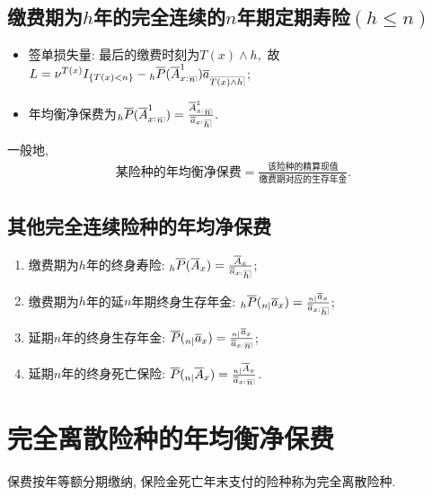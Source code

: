 \documentclass[lang=cn,10pt]{elegantbook}
\makeatletter
\DeclareRobustCommand{\annu}[1]{_{%
    \def\arraystretch{0}%
    \setlength\arraycolsep{1pt}%
    \setlength\arrayrulewidth{.2pt}%
    \begin{array}[b]{@{}c|}\hline
        \\[\arraycolsep]%
        \scriptstyle #1%
    \end{array}%
}}
\makeatother
\begin{document}
\subsection{缴费期为$h$年的完全连续的$n$年期定期寿险$(h\le n)$}
\begin{proposition}
    \begin{itemize}
        \item 签单损失量: 最后的缴费时刻为$T(x)\land h,$ 故$L=\nu^{T(x)}I_{\{T(x)<n\}}-{}_{h}\overline{P}(\overline{A}^{1}_{x:}{}_{\annu n})\overline{a}_{\annu{T(x)\land h}}$;
        \item 年均衡净保费为${}_{h}\overline{P}(\overline{A}^{1}_{x:}{}_{\annu n})=\frac{\overline{A}^{1}_{x:}{}_{\annu n}}{\overline{a}_{x:}{}{\annu{h}}}.$
    \end{itemize}
\end{proposition}

\begin{remark}
    一般地,
    \begin{align*}
  \text{某险种的年均衡净保费}=\frac{\text{该险种的精算现值}}{\text{缴费期对应的生存年金}}.
  \end{align*}
  \end{remark}

\subsection{其他完全连续险种的年均净保费}

\begin{proposition}
    \begin{enumerate}
        \item 缴费期为$h$年的终身寿险: $_{h}\overline{P}(\overline{A}_{x})=\frac{\overline{A}_{x}}{\overline{a}_{x:}{}\annu h}$; 
        \item 缴费期为$h$年的延$n$年期终身生存年金: $_{h}\overline{P}(_{n|}\overline{a}_{x})=\frac{_{n|}\overline{a}_{x}}{\overline{a}_{x:}{}{\annu h}}$;
        \item 延期$n$年的终身生存年金: $\overline{P}(_{n|}\overline{a}_{x})=\frac{_{n|}\overline{a}_{x}}{\overline{a}_{x:}{}\annu n}$;
        \item 延期$n$年的终身死亡保险: $\overline{P}(_{n|}\overline{A}_{x})=\frac{_{n|}\overline{A}_{x}}{\overline{a}_{x:}{}\annu n}$.
    \end{enumerate}
\end{proposition}


\section{完全离散险种的年均衡净保费}
\begin{definition}
    保费按年等额分期缴纳, 保险金死亡年末支付的险种称为完全离散险种.
\end{definition}
\end{document}
